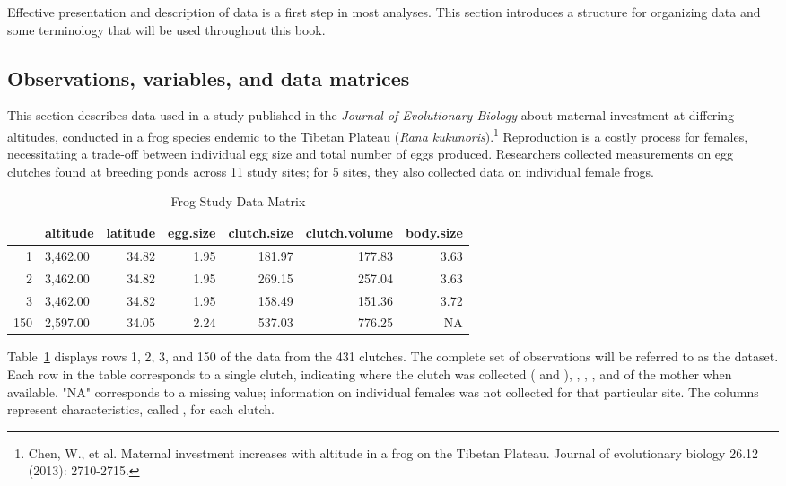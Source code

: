 Effective presentation and description of data is a first step in most analyses. This section introduces a structure for organizing data and some terminology that will be used throughout this book.


\subsection{Observations, variables, and data matrices}
\label{frogDataExample}

This section describes data used in a study published in the \textit{Journal of Evolutionary Biology} about maternal investment at differing altitudes, conducted in a frog species endemic to the Tibetan Plateau (\textit{Rana kukunoris}).\footnote{Chen, W., et al. Maternal investment increases with altitude in a frog on the Tibetan Plateau. Journal of evolutionary biology 26.12 (2013): 2710-2715.} Reproduction is a costly process for females, necessitating a trade-off between individual egg size and total number of eggs produced. Researchers collected measurements on egg clutches found at breeding ponds across 11 study sites; for 5 sites, they also collected data on individual female frogs.

\begin{table}[ht]
\centering
\begin{tabular}{rlrrrrr}
  \hline
 & altitude & latitude & egg.size & clutch.size & clutch.volume & body.size \\ 
  \hline
1 & 3,462.00 & 34.82 & 1.95 & 181.97 & 177.83 & 3.63 \\ 
  2 & 3,462.00 & 34.82 & 1.95 & 269.15 & 257.04 & 3.63 \\ 
  3 & 3,462.00 & 34.82 & 1.95 & 158.49 & 151.36 & 3.72 \\ 
  150 & 2,597.00 & 34.05 & 2.24 & 537.03 & 776.25 & NA \\ 
   \hline
\end{tabular}
\caption{Frog Study Data Matrix} 
\label{frogDF}
\end{table}

Table~\ref{frogDF} displays rows 1, 2, 3, and 150 of the data from the 431 clutches. The complete set of observations will be referred to as the  dataset. Each row in the table corresponds to a single clutch, indicating where the clutch was collected ( and ), , , , and  of the mother when available. "NA" corresponds to a missing value; information on individual females was not collected for that particular site. The columns represent characteristics, called , for each clutch.

